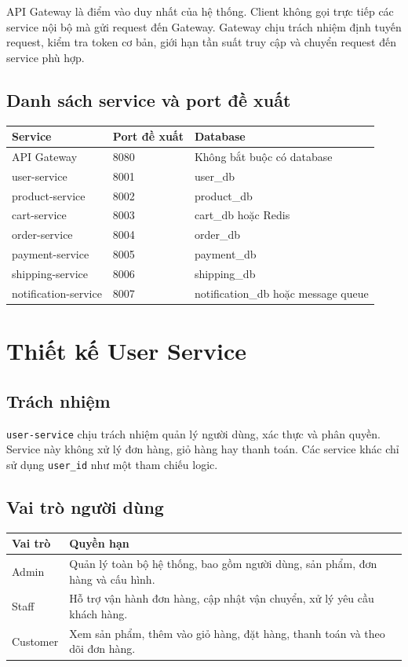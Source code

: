 API Gateway là điểm vào duy nhất của hệ thống. Client không gọi trực tiếp các service nội bộ mà gửi request đến Gateway. Gateway chịu trách nhiệm định tuyến request, kiểm tra token cơ bản, giới hạn tần suất truy cập và chuyển request đến service phù hợp.

\subsection{Danh sách service và port đề xuất}

\begin{longtable}{|p{4cm}|p{4cm}|p{5cm}|}
\hline
\textbf{Service} & \textbf{Port đề xuất} & \textbf{Database} \\
\hline
API Gateway & 8080 & Không bắt buộc có database \\
\hline
user-service & 8001 & user\_db \\
\hline
product-service & 8002 & product\_db \\
\hline
cart-service & 8003 & cart\_db hoặc Redis \\
\hline
order-service & 8004 & order\_db \\
\hline
payment-service & 8005 & payment\_db \\
\hline
shipping-service & 8006 & shipping\_db \\
\hline
notification-service & 8007 & notification\_db hoặc message queue \\
\hline
\end{longtable}

\section{Thiết kế User Service}

\subsection{Trách nhiệm}

\texttt{user-service} chịu trách nhiệm quản lý người dùng, xác thực và phân quyền. Service này không xử lý đơn hàng, giỏ hàng hay thanh toán. Các service khác chỉ sử dụng \texttt{user\_id} như một tham chiếu logic.

\subsection{Vai trò người dùng}

\begin{longtable}{|p{3cm}|p{10cm}|}
\hline
\textbf{Vai trò} & \textbf{Quyền hạn} \\
\hline
Admin & Quản lý toàn bộ hệ thống, bao gồm người dùng, sản phẩm, đơn hàng và cấu hình. \\
\hline
Staff & Hỗ trợ vận hành đơn hàng, cập nhật vận chuyển, xử lý yêu cầu khách hàng. \\
\hline
Customer & Xem sản phẩm, thêm vào giỏ hàng, đặt hàng, thanh toán và theo dõi đơn hàng. \\
\hline
\end{longtable}

